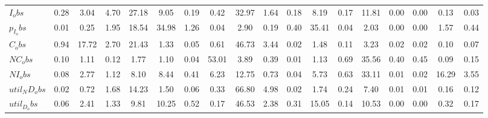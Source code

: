 \begin{center}
\begin{longtable}{lccccccccccccccccc}
$I_obs        $	 & 	            0.28	 & 	            3.04	 & 	            4.70	 & 	           27.18	 & 	            9.05	 & 	            0.19	 & 	            0.42	 & 	           32.97	 & 	            1.64	 & 	            0.18	 & 	            8.19	 & 	            0.17	 & 	           11.81	 & 	            0.00	 & 	            0.00	 & 	            0.13	 & 	            0.03 \\ 
$p_I_obs      $	 & 	            0.01	 & 	            0.25	 & 	            1.95	 & 	           18.54	 & 	           34.98	 & 	            1.26	 & 	            0.04	 & 	            2.90	 & 	            0.19	 & 	            0.40	 & 	           35.41	 & 	            0.04	 & 	            2.03	 & 	            0.00	 & 	            0.00	 & 	            1.57	 & 	            0.44 \\ 
$C_obs        $	 & 	            0.94	 & 	           17.72	 & 	            2.70	 & 	           21.43	 & 	            1.33	 & 	            0.05	 & 	            0.61	 & 	           46.73	 & 	            3.44	 & 	            0.02	 & 	            1.48	 & 	            0.11	 & 	            3.23	 & 	            0.02	 & 	            0.02	 & 	            0.10	 & 	            0.07 \\ 
$NC_obs       $	 & 	            0.10	 & 	            1.11	 & 	            0.12	 & 	            1.77	 & 	            1.10	 & 	            0.04	 & 	           53.01	 & 	            3.89	 & 	            0.39	 & 	            0.01	 & 	            1.13	 & 	            0.69	 & 	           35.56	 & 	            0.40	 & 	            0.45	 & 	            0.09	 & 	            0.15 \\ 
$NI_obs       $	 & 	            0.08	 & 	            2.77	 & 	            1.12	 & 	            8.10	 & 	            8.44	 & 	            0.41	 & 	            6.23	 & 	           12.75	 & 	            0.73	 & 	            0.04	 & 	            5.73	 & 	            0.63	 & 	           33.11	 & 	            0.01	 & 	            0.02	 & 	           16.29	 & 	            3.55 \\ 
$util_ND_obs  $	 & 	            0.02	 & 	            0.72	 & 	            1.68	 & 	           14.23	 & 	            1.50	 & 	            0.06	 & 	            0.33	 & 	           66.80	 & 	            4.98	 & 	            0.02	 & 	            1.74	 & 	            0.24	 & 	            7.40	 & 	            0.01	 & 	            0.01	 & 	            0.16	 & 	            0.12 \\ 
$util_D_obs   $	 & 	            0.06	 & 	            2.41	 & 	            1.33	 & 	            9.81	 & 	           10.25	 & 	            0.52	 & 	            0.17	 & 	           46.53	 & 	            2.38	 & 	            0.31	 & 	           15.05	 & 	            0.14	 & 	           10.53	 & 	            0.00	 & 	            0.00	 & 	            0.32	 & 	            0.17 \\ 

\end{longtable}
\end{center}

